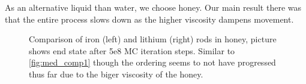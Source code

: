 As an alternative liquid than water, we choose honey. Our main result there was that the entire process slows down as the higher viscosity dampens movement.
\begin{figure}[h]
  \begin{minipage}[t]{0.45\textwidth}
  \end{minipage}
  \hfill
  \begin{minipage}[t]{0.45\textwidth}
  \end{minipage}
  \caption{Comparison of iron (left) and lithium (right) rods in honey, picture shows end state after 5e8 MC iteration steps. Similar to \ref{fig:med_comp1} though the ordering seems to not have progressed thus far due to the biger viscosity of the honey.}
  \label{fig:med_comp3}
\end{figure}
